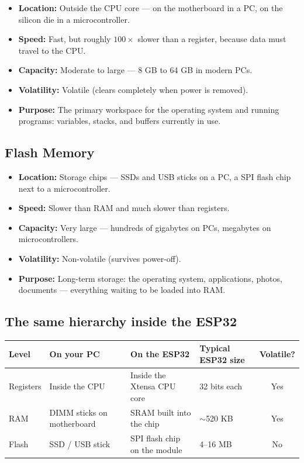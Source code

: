 \documentclass[11pt]{article}
\begin{document}
\begin{itemize}
    \item \textbf{Location:} Outside the CPU core --- on the motherboard in a PC, on the silicon die in a microcontroller.
    \item \textbf{Speed:} Fast, but roughly $100\times$ slower than a register, because data must travel to the CPU.
    \item \textbf{Capacity:} Moderate to large --- 8 GB to 64 GB in modern PCs.
    \item \textbf{Volatility:} Volatile (clears completely when power is removed).
    \item \textbf{Purpose:} The primary workspace for the operating system and running programs: variables, stacks, and buffers currently in use.
\end{itemize}

\subsection{Flash Memory}

\begin{itemize}
    \item \textbf{Location:} Storage chips --- SSDs and USB sticks on a PC, a SPI flash chip next to a microcontroller.
    \item \textbf{Speed:} Slower than RAM and much slower than registers.
    \item \textbf{Capacity:} Very large --- hundreds of gigabytes on PCs, megabytes on microcontrollers.
    \item \textbf{Volatility:} Non-volatile (survives power-off).
    \item \textbf{Purpose:} Long-term storage: the operating system, applications, photos, documents --- everything waiting to be loaded into RAM.
\end{itemize}

\subsection{The same hierarchy inside the ESP32}

\begin{table}[htbp]
\centering
\renewcommand{\arraystretch}{1.3}
\begin{tabularx}{\textwidth}{@{}l X X l c@{}}
\toprule
\textbf{Level} & \textbf{On your PC} & \textbf{On the ESP32} & \textbf{Typical ESP32 size} & \textbf{Volatile?} \\
\midrule
Registers & Inside the CPU & Inside the Xtensa CPU core & 32 bits each & Yes \\
RAM & DIMM sticks on motherboard & SRAM built into the chip & $\sim$520 KB & Yes \\
Flash & SSD / USB stick & SPI flash chip on the module & 4--16 MB & No \\
\bottomrule
\end{tabularx}
\end{table}
\end{document}
